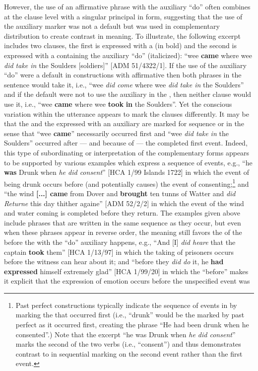 However, the use of an affirmative  phrase with the auxiliary “do” often combines at the clause level with a singular principal  in  form, suggesting that the use of the auxiliary marker was not a default but was used in complementary distribution to create contrast in meaning. To illustrate, the following excerpt includes two clauses, the first is expressed with a   (in bold) and the second is expressed with a  containing the auxiliary “do” (italicized): “wee \textbf{came} where wee \textit{did take in} the Soulders [soldiers]” [ADM 51/4322/1]. If the use of the auxiliary “do” were a default in constructions with affirmative  then both  phrases in the sentence would take it, i.e., “wee \textit{did come} where wee \textit{did take in} the Soulders” and if the default were not to use the auxiliary in the , then neither clause would use it, i.e., “wee \textbf{came} where wee \textbf{took} \textbf{in} the Soulders”. Yet the conscious variation within the utterance appears to mark the clauses differently. It may be that the  and the  expressed with an auxiliary are marked for sequence or  in the sense that “wee \textbf{came}” necessarily occurred first and “wee \textit{did take in} the Soulders” occurred after — and because of — the completed first event. Indeed, this type of subordinating or  interpretation of the complementary  forms appears to be supported by various examples which express a sequence of events, e.g., “he \textbf{was} Drunk when \textit{he did consent}” [HCA 1/99  Islands 1722] in which the event of being drunk occurs before (and potentially causes) the event of consenting;\footnote{Past perfect constructions typically indicate the sequence of events in  by marking the  that occurred first (i.e., “drunk” would be the  marked by past perfect as it occurred first, creating the phrase “He had been drunk when he consented”.) Note that the excerpt “he was Drunk when \textit{he did consent}” marks the second of the two verbs (i.e., “consent”) and thus demonstrates contrast to  in sequential marking on the second event rather than the first event.}  and “the wind\textbf{ [...] came} from Dover and \textbf{brought} ten tunns of Watter and \textit{did Returne} this day thither againe” [ADM 52/2/2] in which the event of the wind and water coming is completed before they return. The examples given above include  phrases that are written in the same sequence as they occur, but even when these  phrases appear in reverse order, the meaning still favors the  of the   before the  with the “do” auxiliary happens, e.g., “And [I] \textit{did heare} that the captain \textbf{took} them” [HCA 1/13/97] in which the taking of prisoners occurs before the witness can hear about it; and “before they \textit{did do} it, he \textbf{had} \textbf{expressed} himself extremely glad” [HCA 1/99/20] in which the  “before” makes it explicit that the expression of emotion occurs before the unspecified event was 